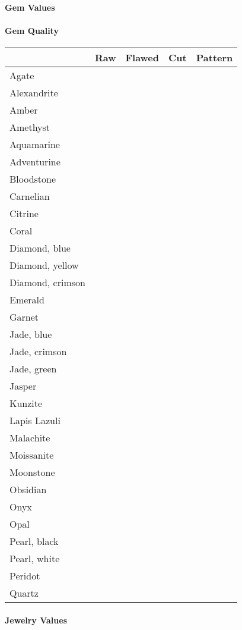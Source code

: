 \paragraph{Gem Values}

\paragraph{Gem Quality}
\begin{tabular}{l | l l l l}
    & Raw & Flawed & Cut & Pattern \\
    \hline
    Agate & & & & \\
    Alexandrite & & & & \\
    Amber & & & & \\
    Amethyst & & & & \\
    Aquamarine & & & & \\
    Adventurine & & & & \\
    Bloodstone & & & & \\
    Carnelian & & & & \\
    Citrine & & & & \\
    Coral & & & & \\
    Diamond, blue & & & & \\
    Diamond, yellow & & & & \\
    Diamond, crimson & & & & \\
    Emerald & & & & \\
    Garnet & & & & \\
    Jade, blue & & & & \\
    Jade, crimson & & & & \\
    Jade, green & & & & \\
    Jasper & & & & \\
    Kunzite & & & & \\
    Lapis Lazuli & & & & \\
    Malachite & & & & \\
    Moissanite & & & & \\
    Moonstone & & & & \\
    Obsidian & & & & \\
    Onyx & & & & \\
    Opal & & & & \\
    Pearl, black & & & & \\
    Pearl, white & & & & \\
    Peridot & & & & \\
    Quartz & & & & \\
\end{tabular}


\paragraph{Jewelry Values}
